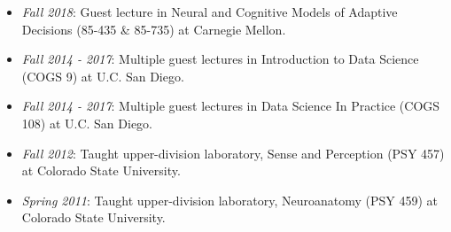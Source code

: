 \begin{itemize}
\tightlist
\item
  \emph{Fall 2018}: Guest lecture in Neural and Cognitive Models of
  Adaptive Decisions (85-435 \& 85-735) at Carnegie Mellon.
\item
  \emph{Fall 2014 - 2017}: Multiple guest lectures in Introduction to
  Data Science (COGS 9) at U.C. San Diego.
\item
  \emph{Fall 2014 - 2017}: Multiple guest lectures in Data Science In
  Practice (COGS 108) at U.C. San Diego.
\item
  \emph{Fall 2012}: Taught upper-division laboratory, Sense and
  Perception (PSY 457) at Colorado State University.
\item
  \emph{Spring 2011}: Taught upper-division laboratory, Neuroanatomy
  (PSY 459) at Colorado State University.
\end{itemize}
